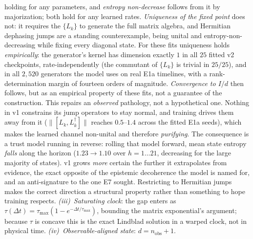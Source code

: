 \documentclass[journal]{IEEEtran}
\begin{document}
holding for any parameters, and \emph{entropy non-decrease} follows from it by
majorization; both hold for any learned rates. \emph{Uniqueness of the fixed point}
does not: it requires the $\{L_k\}$ to generate the full matrix algebra, and Hermitian
dephasing jumps are a standing counterexample, being unital and
entropy-non-decreasing while fixing every diagonal state. For these fits uniqueness
holds \emph{empirically}: the generator's kernel has dimension exactly $1$ in all
$25$ fitted v2 checkpoints, rate-independently (the commutant of $\{L_k\}$ is trivial
in $25/25$), and in all $2{,}520$ generators the model uses on real E1a timelines,
with a rank-determination margin of fourteen orders of magnitude. \emph{Convergence
to $I/d$} then follows, but as an empirical property of these fits, not a guarantee of
the construction. This repairs an \emph{observed} pathology, not a hypothetical one. Nothing in
v1 constrains its jump operators to stay normal, and training drives them away from
it ($\|[L_k,L_k^\dagger]\|$ reaches $0.5$--$1.4$ across the fitted E1a seeds), which makes the
learned channel non-unital and therefore \emph{purifying}. The consequence is a
trust model running in reverse: rolling that model forward, mean state entropy
\emph{falls} along the horizon ($1.23 \to 1.10$ over $h = 1 \ldots 21$, decreasing
for the large majority of states). v1 grows \emph{more} certain the further it
extrapolates from evidence, the exact opposite of the epistemic decoherence the
model is named for, and an anti-signature to the one E7 sought. Restricting to
Hermitian jumps makes the correct direction a structural property rather than
something to hope training respects.
\emph{(iii)~Saturating clock}: the gap enters as
$\tau(\Delta t) = \tau_{\max}(1 - e^{-\Delta t/\tau_{\max}})$, bounding the matrix
exponential's argument; because $\tau$ is concave this is the exact Lindblad
solution in a warped clock, not in physical time.
\emph{(iv)~Observable-aligned state}: $d = n_{\mathrm{obs}}{+}1$.
\end{document}
